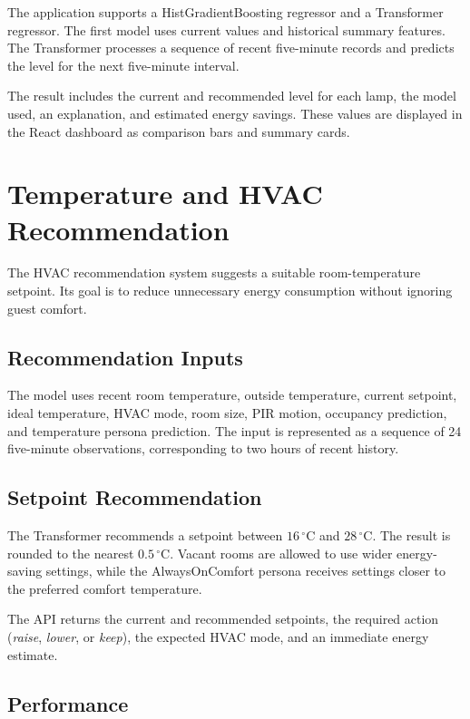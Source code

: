 The application supports a HistGradientBoosting regressor and a Transformer
regressor. The first model uses current values and historical summary
features. The Transformer processes a sequence of recent five-minute records
and predicts the level for the next five-minute interval.

The result includes the current and recommended level for each lamp, the model
used, an explanation, and estimated energy savings. These values are displayed
in the React dashboard as comparison bars and summary cards.


\chapter{Temperature and HVAC Recommendation}
\label{chap:temperature-recommendation}

The HVAC recommendation system suggests a suitable room-temperature setpoint.
Its goal is to reduce unnecessary energy consumption without ignoring guest
comfort.

\section{Recommendation Inputs}

The model uses recent room temperature, outside temperature, current setpoint,
ideal temperature, HVAC mode, room size, PIR motion, occupancy prediction, and
temperature persona prediction. The input is represented as a sequence of 24
five-minute observations, corresponding to two hours of recent history.

\section{Setpoint Recommendation}

The Transformer recommends a setpoint between
$16\,^{\circ}\mathrm{C}$ and $28\,^{\circ}\mathrm{C}$. The result is rounded
to the nearest $0.5\,^{\circ}\mathrm{C}$. Vacant rooms are allowed to use
wider energy-saving settings, while the AlwaysOnComfort persona receives
settings closer to the preferred comfort temperature.

The API returns the current and recommended setpoints, the required action
(\textit{raise}, \textit{lower}, or \textit{keep}), the expected HVAC mode,
and an immediate energy estimate.

\section{Performance}

